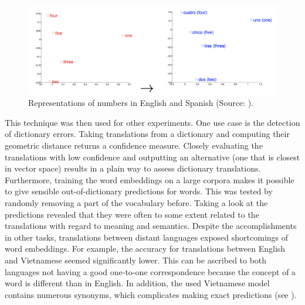 \documentclass[
]{krantz}
\begin{document}
\begin{figure}

{\centering \includegraphics[width=0.9\linewidth]{./figures/01-01-nlp/embed_transl_mikolova_p2} 

}

\caption{Representations of numbers in English and Spanish (Source: \citet{Mikolov2013a}).}\label{fig:embedTransl}
\end{figure}



This technique was then used for other experiments. One use case is the
detection of dictionary errors. Taking translations from a dictionary
and computing their geometric distance returns a confidence measure.
Closely evaluating the translations with low confidence and outputting
an alternative (one that is closest in vector space) results in a plain
way to assess dictionary translations. Furthermore, training the word
embeddings on a large corpora makes it possible to give sensible
out-of-dictionary predictions for words. This was tested by randomly
removing a part of the vocabulary before. Taking a look at the
predictions revealed that they were often to some extent related to the
translations with regard to meaning and semantics. Despite the
accomplishments in other tasks, translations between distant languages
exposed shortcomings of word embeddings. For example, the accuracy for
translations between English and Vietnamese seemed significantly lower.
This can be ascribed to both languages not having a good one-to-one
correspondence because the concept of a word is different than in
English. In addition, the used Vietnamese model contains numerous
synonyms, which complicates making exact predictions (see
\citet{Mikolov2013a}).\\
\end{document}
